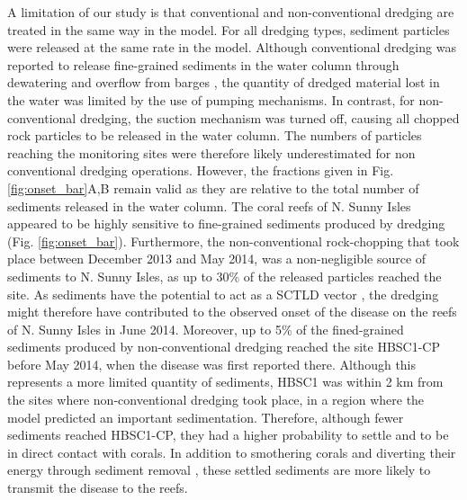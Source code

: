 \documentclass[preprint,12pt,authoryear]{elsarticle}
\begin{document}
A limitation of our study is that conventional and non-conventional dredging are treated in the same way in the model. For all dredging types, sediment particles were released at the same rate in the model. Although conventional dredging was reported to release fine-grained sediments in the water column through dewatering and overflow from barges \citep{jones2016assessing}, the quantity of dredged material lost in the water was limited by the use of pumping mechanisms. In contrast, for non-conventional dredging, the suction mechanism was turned off, causing all chopped rock particles to be released in the water column. The numbers of particles reaching the monitoring sites were therefore likely underestimated for non conventional dredging operations. However, the fractions given in Fig. \ref{fig:onset_bar}A,B remain valid as they are relative to the total number of sediments released in the water column. The coral reefs of N. Sunny Isles appeared to be highly sensitive to fine-grained sediments produced by dredging (Fig. \ref{fig:onset_bar}). Furthermore, the non-conventional rock-chopping that took place between December 2013 and May 2014, was a non-negligible source of sediments to N. Sunny Isles, as up to 30\% of the released particles reached the site. As sediments have the potential to act as a SCTLD vector \citep{rosales2020rhodobacterales, studivan2022reef}, the dredging might therefore have contributed to the observed onset of the disease on the reefs of N. Sunny Isles in June 2014. Moreover, up to 5\% of the fined-grained sediments produced by non-conventional dredging reached the site HBSC1-CP before May 2014, when the disease was first reported there. Although this represents a more limited quantity of sediments, HBSC1 was within 2 km from the sites where non-conventional dredging took place, in a region where the model predicted an important sedimentation. Therefore, although fewer sediments reached HBSC1-CP, they had a higher probability to settle and to be in direct contact with corals. In addition to smothering corals and diverting their energy through sediment removal \citep{erftemeijer2012environmental}, these settled sediments are more likely to transmit the disease to the reefs.
\end{document}
